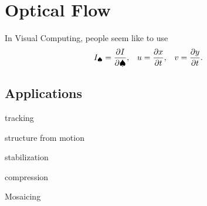 \chapter{Optical Flow}
In Visual Computing, people seem like to use
\begin{align*}
	I_{\spadesuit}&=\frac{\partial I}{\partial \spadesuit},&u&=\frac{\partial x}{\partial t},&v&=\frac{\partial y}{\partial t}.
\end{align*}
\section{Applications}
\begin{enumerate*}[label=\protect\circled{\arabic*}]
	\item tracking
	\item structure from motion
	\item stabilization
	\item compression
	\item Mosaicing
\end{enumerate*}

